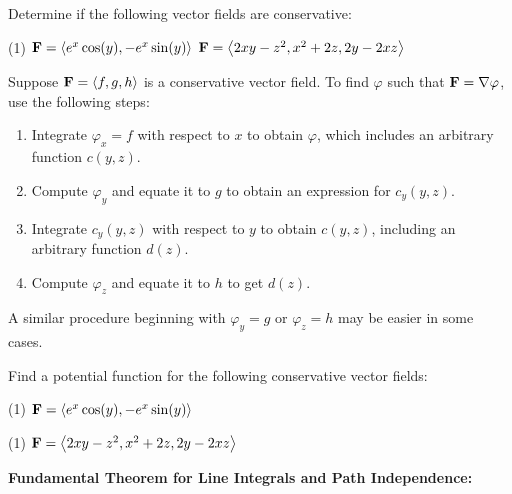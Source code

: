 \documentclass[../mathNotesPreamble]{subfiles}
\begin{document}
  \begin{ex*}
    Determine if the following vector fields are conservative:
  \end{ex*}
  \begin{tasks}[after-item-skip=\stretch{1}, label=](1)
    \task $\mathbf F={\left\langle e^x\cos(y),-e^x\sin(y) \right\rangle}$
    \task $\mathbf F={\left\langle 2xy-z^2, x^2+2z, 2y-2xz \right\rangle}$
  \end{tasks}
  \pagebreak

  \begin{thmBox*}
    Suppose $\mathbf F={\left\langle f,g,h \right\rangle}$ is a conservative vector field. To find $\varphi$ such that $\mathbf F=\nabla \varphi$, use the following steps:
    \begin{enumerate}
      \item 
        Integrate $\varphi_x=f$ with respect to $x$ to obtain $\varphi$, which includes an arbitrary function $c(y,z)$.
      \item 
        Compute $\varphi_y$ and equate it to $g$ to obtain an expression for $c_y(y,z)$.
      \item 
        Integrate $c_y(y,z)$ with respect to $y$ to obtain $c(y,z)$, including an arbitrary function $d(z)$.
      \item 
        Compute $\varphi_z$ and equate it to $h$ to get $d(z)$.
    \end{enumerate}
    A similar procedure beginning with $\varphi_y=g$ or $\varphi_z=h$ may be easier in some cases.
  \end{thmBox*}

  \begin{ex*}
    Find a potential function for the following conservative vector fields:
  \end{ex*}
  \begin{tasks}[after-item-skip=\stretch{1}, label=](1)
    \task $\mathbf F={\left\langle e^x\cos(y),-e^x\sin(y) \right\rangle}$
  \end{tasks}
  \pagebreak

  \begin{tasks}[after-item-skip=\stretch{1}, label=](1)
    \task $\mathbf F={\left\langle 2xy-z^2, x^2+2z, 2y-2xz \right\rangle}$
  \end{tasks}
  \pagebreak

  \noindent\textbf{Fundamental Theorem for Line Integrals and Path Independence:}
\end{document}
